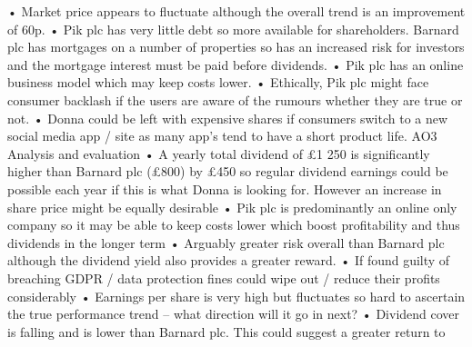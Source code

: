\documentclass{article}
\begin{document}
• Market price appears to fluctuate although the overall trend is an improvement of 60p. \newline
• Pik plc has very little debt so more available for shareholders.  Barnard plc has mortgages on a \newline
number of properties so has an increased risk for investors and the mortgage interest must be paid \newline
before dividends. \newline
• Pik plc has an online business model which may keep costs lower. \newline
• Ethically, Pik plc might face consumer backlash if the users are aware of the rumours whether they \newline
are true or not. \newline
• Donna could be left with expensive shares if consumers switch to a new social media app / site as \newline
many app’s tend to have a short product life. \newline
 \newline
AO3 Analysis and evaluation \newline
• A yearly total dividend of £1 250 is significantly higher than Barnard plc (£800) by £450 so regular \newline
dividend earnings could be possible each year if this is what Donna is looking for.  However an \newline
increase in share price might be equally desirable \newline
• Pik plc is predominantly an online only company so it may be able to keep costs lower which boost \newline
profitability and thus dividends in the longer term \newline
• Arguably greater risk overall than Barnard plc although the dividend yield also provides a greater \newline
reward. \newline
• If found guilty of breaching GDPR / data protection fines could wipe out / reduce their profits \newline
considerably  \newline
• Earnings per share is very high but fluctuates so hard to ascertain the true performance trend – what \newline
direction will it go in next? \newline
• Dividend cover is falling and is lower than Barnard plc.  This could suggest a greater return to \newline
\end{document}
